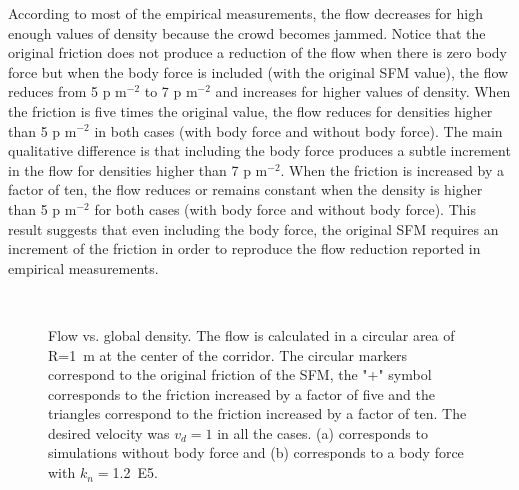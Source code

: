 \documentclass[preprint,12pt]{elsarticle}
\begin{document}
According to most of the empirical measurements, the flow decreases for high enough values of density because the crowd becomes jammed. Notice that the original friction does not produce a reduction of the flow when there is zero body force but when the body force is included (with the original SFM value), the flow reduces from  5 p m$^{-2}$ to 7 p m$^{-2}$ and increases for higher values of density. When the friction is five times the original value, the flow reduces for densities higher than 5 p m$^{-2}$ in both cases (with body force and without body force). The main qualitative difference is that including the body force produces a subtle increment in the flow for densities higher than 7 p m$^{-2}$. When the friction is increased by a factor of ten, the flow reduces or remains constant when the density is higher than 5 p m$^{-2}$ for both cases (with body force and without body force). This result suggests that even including the body force, the original SFM requires an increment of the friction in order to reproduce the flow reduction reported in empirical measurements.\\


\begin{figure}[!htbp]
\centering
    \ 
    \\
\caption[width=0.47\columnwidth]{Flow vs. global density. The flow is calculated in a circular area of R=1~m at the center of the corridor. The circular markers correspond to the original friction of the SFM, the "+" symbol corresponds to the friction increased by a factor of five and the triangles correspond to the friction increased by a factor of ten. The desired velocity was $v_d=1$ in all the cases. (a) corresponds to simulations without body force and (b) corresponds to a body force with $k_n=$1.2~E5.}
\label{flow_density}
\end{figure}
\end{document}
